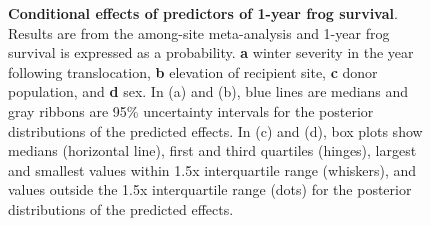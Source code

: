 \documentclass[
  letterpaper,
  DIV=11,
  numbers=noendperiod]{scrartcl}
\begin{document}
\begin{figure}


\caption{\label{fig-cond-effects}\textbf{Conditional effects of
predictors of 1-year frog survival}. Results are from the among-site
meta-analysis and 1-year frog survival is expressed as a probability.
\textbf{a} winter severity in the year following translocation,
\textbf{b} elevation of recipient site, \textbf{c} donor population, and
\textbf{d} sex. In (a) and (b), blue lines are medians and gray ribbons
are 95\% uncertainty intervals for the posterior distributions of the
predicted effects. In (c) and (d), box plots show medians (horizontal
line), first and third quartiles (hinges), largest and smallest values
within 1.5x interquartile range (whiskers), and values outside the 1.5x
interquartile range (dots) for the posterior distributions of the
predicted effects.}

\end{figure}%

\newpage
\end{document}
